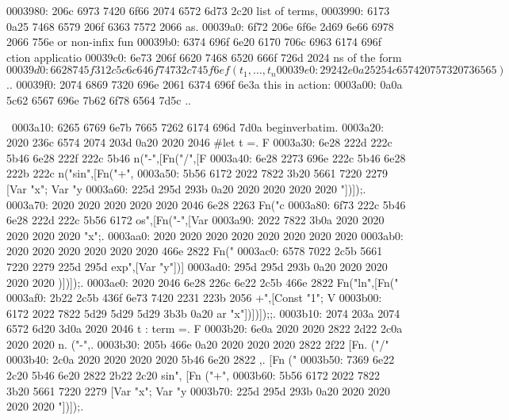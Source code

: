 \begin{bo
00010e0: 7865 647d 5c62 6567 696e 7b76 6572 6261  xed}
\begin{verba
00010f0: 7469 6d7d 0a20 2023 7479 7065 2074 6572  tim}
\begin{
0001c40: 7665 7262 6174 696d 7d0a 2020 236c 6574  verbatim}
\begin{boxe
00027a0: 647d 5c62 6567 696e 7b76 6572 6261 7469  d}
\begin{verbati
00027b0: 6d7d 0a20 2023 6c65 7420 696e 6669 7865  m}
\begin{v
0002c60: 6572 6261 7469 6d7d 0a20 2023 6c65 7420  erbatim}
\begin{
0002dc0: 7665 7262 6174 696d 7d0a 2020 236c 6574  verbatim}
\begin{boxed
0002f30: 7d5c 6265 6769 6e7b 7665 7262 6174 696d  }
\begin{verbatim
0002f40: 7d0a 2020 236c 6574 2068 6428 683a 3a74  }
0003980: 206c 6973 7420 6f66 2074 6572 6d73 2c20   list of terms, 
0003990: 6173 0a25 7468 6579 206f 6363 7572 2066  as.%
00039a0: 6f72 206e 6f6e 2d69 6e66 6978 2066 756e  or non-infix fun
00039b0: 6374 696f 6e20 6170 706c 6963 6174 696f  ction applicatio
00039c0: 6e73 206f 6620 7468 6520 666f 726d 2024  ns of the form $
00039d0: 6628 745f 312c 5c6c 646f 7473 2c74 5f6e  f(t_1,\ldots,t_n
00039e0: 2924 2e0a 2525 4c65 7420 7573 2073 6565  )$..%
00039f0: 2074 6869 7320 696e 2061 6374 696f 6e3a   this in action:
0003a00: 0a0a 5c62 6567 696e 7b62 6f78 6564 7d5c  ..\begin{boxed}\
0003a10: 6265 6769 6e7b 7665 7262 6174 696d 7d0a  begin{verbatim}.
0003a20: 2020 236c 6574 2074 203d 0a20 2020 2046    #let t =.    F
0003a30: 6e28 222d 222c 5b46 6e28 222f 222c 5b46  n("-",[Fn("/",[F
0003a40: 6e28 2273 696e 222c 5b46 6e28 222b 222c  n("sin",[Fn("+",
0003a50: 5b56 6172 2022 7822 3b20 5661 7220 2279  [Var "x"; Var "y
0003a60: 225d 295d 293b 0a20 2020 2020 2020 2020  "])]);.         
0003a70: 2020 2020 2020 2020 2020 2046 6e28 2263             Fn("c
0003a80: 6f73 222c 5b46 6e28 222d 222c 5b56 6172  os",[Fn("-",[Var
0003a90: 2022 7822 3b0a 2020 2020 2020 2020 2020   "x";.          
0003aa0: 2020 2020 2020 2020 2020 2020 2020 2020                  
0003ab0: 2020 2020 2020 2020 2020 2020 466e 2822              Fn("
0003ac0: 6578 7022 2c5b 5661 7220 2279 225d 295d  exp",[Var "y"])]
0003ad0: 295d 295d 293b 0a20 2020 2020 2020 2020  )])]);.         
0003ae0: 2020 2046 6e28 226c 6e22 2c5b 466e 2822     Fn("ln",[Fn("
0003af0: 2b22 2c5b 436f 6e73 7420 2231 223b 2056  +",[Const "1"; V
0003b00: 6172 2022 7822 5d29 5d29 5d29 3b3b 0a20  ar "x"])])]);;. 
0003b10: 2074 203a 2074 6572 6d20 3d0a 2020 2046   t : term =.   F
0003b20: 6e0a 2020 2020 2822 2d22 2c0a 2020 2020  n.    ("-",.    
0003b30: 205b 466e 0a20 2020 2020 2020 2822 2f22   [Fn.       ("/"
0003b40: 2c0a 2020 2020 2020 2020 5b46 6e20 2822  ,.        [Fn ("
0003b50: 7369 6e22 2c20 5b46 6e20 2822 2b22 2c20  sin", [Fn ("+", 
0003b60: 5b56 6172 2022 7822 3b20 5661 7220 2279  [Var "x"; Var "y
0003b70: 225d 295d 293b 0a20 2020 2020 2020 2020  "])]);.         

\end{boxed}
\end{verbatim
0002f40: 7d0a 2020 236c 6574 2068 6428 683a 3a74  }
\end{boxed
0002f30: 7d5c 6265 6769 6e7b 7665 7262 6174 696d  }
\end{
0002dc0: 7665 7262 6174 696d 7d0a 2020 236c 6574  verbatim}
\end{v
0002c60: 6572 6261 7469 6d7d 0a20 2023 6c65 7420  erbatim}
\end{verbati
00027b0: 6d7d 0a20 2023 6c65 7420 696e 6669 7865  m}
\end{boxe
00027a0: 647d 5c62 6567 696e 7b76 6572 6261 7469  d}
\end{
0001c40: 7665 7262 6174 696d 7d0a 2020 236c 6574  verbatim}
\end{verba
00010f0: 7469 6d7d 0a20 2023 7479 7065 2074 6572  tim}
\end{bo
00010e0: 7865 647d 5c62 6567 696e 7b76 6572 6261  xed}

